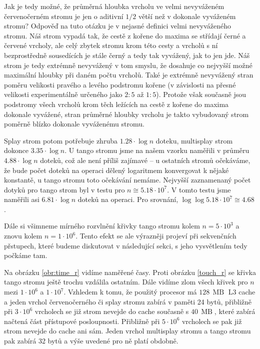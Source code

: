 Jak je tedy možné, že průměrná hloubka vrcholu ve velmi nevyváženém červenočerném stromu je jen o aditivní $1/2$ větší než v dokonale vyváženém stromu? Odpověď na tuto otázku je v nejasné definici velmi nevyváženého stromu. Náš strom vypadá tak, že cestě z kořene do maxima se střídají černé a červené vrcholy, ale celý zbytek stromu krom této cesty a vrcholů s ní bezprostředně sousedících je stále černý a tedy tak vyvážený, jak to jen jde. Náš strom je tedy extrémně nevyvážený v tom smyslu, že dosahuje co nejvyšší možné maximální hloubky při daném počtu vrcholů. Také je extrémně nevyvážený stran poměru velikosti pravého a levého podstromu kořene (v závislosti na přesné velikosti experimentálně určeného jako $2:5$ až $1:5$). Protože však současně jsou podstromy všech vrcholů krom těch ležících na cestě z kořene do maxima dokonale vyvážené, stran průměrné hloubky vrcholu je takto vybudovaný strom poměrně blízko dokonale vyváženému stromu.


Splay strom potom potřebuje zhruba $1.28\cdot \log n$ doteku,
multisplay strom dokonce $3.35\cdot \log n$. U tango stromu jsme na našem vzorku naměřili v průměru $4.88\cdot \log n$ doteků, což ale není příliš zajímavé -- u ostatních stromů očekáváme, že bude počet doteků na operaci dělený logaritmem konvergovat k nějaké konstantě, u tango stromu toto očekávání nemáme. Nejvyšší zaznamenaný počet dotyků pro tango strom byl v testu pro $n \cong 5.18\cdot 10^7$. V tomto testu jsme naměřili asi $6.81\cdot \log n$ doteků na operaci. Pro srovnání, $\log\log 5.18\cdot 10^7 \cong 4.68$. 

Dále si všimneme mírného rozvlnění křivky tango stromu kolem $n=5\cdot 10^3$ a znovu kolem $n=1\cdot 10^6$. Tento efekt se ale výrazněji projeví při sekvenčních přstupech, které budeme diskutovat v následující sekci, s jeho vysvětlením tedy počkáme tam.


Na obrázku \ref{obr:time_r} vidíme naměřené časy. Proti obrázku \ref{touch_r}
se křivka tango stromu ještě trochu vzdálila ostatním. Dále vidíme zlom všech
křivek pro $n$ mezi $1\cdot10^6$ a $1\cdot 10^7$. Vzhledem k tomu, že použitý
procesor má $128\,\operatorname{MB}$ L3 cache a jeden vrchol  červenočerného či
splay stromu zabírá v paměti 24 bytů, přibližně při $3\cdot 10^6$ vrcholech se již
strom nevejde do cache současně s $40\,\operatorname{MB}$, které zabírá načtená
část přístupové posloupnosti. Přibližně při $5\cdot10^6$ vrcholech se pak již strom nevejde do cache ani sám.
Jeden vrchol multisplay stromu a tango stromu pak zabírá 32 bytů a výše uvedené pro ně platí obdobně. 


